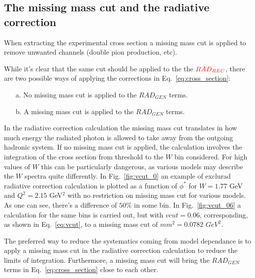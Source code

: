 \subsection{The missing mass cut and the radiative correction}
When extracting the experimental cross section a missing mass cut
is applied to remove unwanted channels (double pion production, etc).

While it's clear that the same cut should be applied to the the $\textcolor{red}{RAD_{REC}}$,
there are two possible ways of applying the corrections in Eq.~\eqref{eq:cross_section}:
\begin{itemize}
 \item[a.] No missing mass cut is applied to the $RAD_{GEN}$ terms.
 \item[b.] A missing mass cut is applied to the $RAD_{GEN}$ terms.
\end{itemize}


In the radiative correction calculation the missing mass cut translates in how much energy the
radiated photon is allowed to take away from the outgoing hadronic system.
If no missing mass cut is applied, the calculation involves the integration of the
cross section from threshold to the $W$ bin considered. For high values of
$W$ this can be particularly dangerous, as various models may describe the $W$ spectra
quite differently. In Fig.~\ref{fig:vcut_0} an example of exclurad radiative correction
calculation is plotted as a function of $\phi^*$ for $W=1.77$ GeV and $Q^2=2.15$ GeV$^2$
with no restriction on missing mass cut for various models. As one
can see, there's a difference of $50\%$ in some bin.
In Fig.~\ref{fig:vcut_06} a calculation for the same bins is carried out, but
with $vcut=0.06$, corresponding, as shown in Eq.~\eqref{eq:vcut},
to a missing mass cut of $mm^2 = 0.0782$ $GeV^2$.

The preferred way to reduce the systematics coming from model dependance
is to apply a missing mass cut in the radiative correction calculation to
reduce the limits of integration. Furthermore, a missing mass cut will
bring the $RAD_{GEN}$ terms in Eq.~\eqref{eq:cross_section} close to each other.

